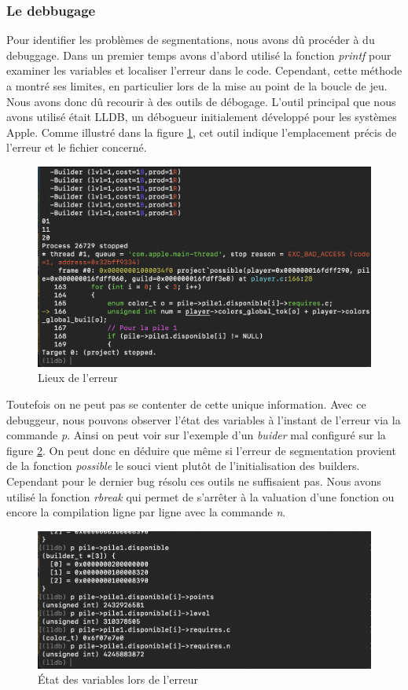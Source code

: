 \documentclass{article}
\begin{document}
\subsubsection{Le debbugage}

\vspace{1em}

 

\hspace{1em} Pour identifier les problèmes de segmentations, nous avons dû procéder à du debuggage. Dans un premier temps avons d'abord utilisé la fonction \emph{printf}  pour examiner les variables et localiser l'erreur dans le code. Cependant, cette méthode a montré ses limites, en particulier lors de la mise au point de la boucle de jeu. Nous avons donc dû recourir à des outils de débogage. L'outil principal que nous avons utilisé était LLDB, un débogueur initialement développé pour les systèmes Apple. Comme illustré dans la figure \ref{fig:lieux erreur}, cet outil indique l'emplacement précis de l'erreur et le fichier concerné.



\begin{figure}[ht]
    \centering
    \includegraphics[width=0.45\linewidth]{Lieux erreur.png}
    \caption{Lieux de l'erreur}
    \label{fig:lieux erreur}
\end{figure}
\newpage
Toutefois on ne peut pas se contenter de cette unique information. Avec ce debuggeur, nous pouvons observer l'état des variables à l'instant de l'erreur via la commande \emph{p}. Ainsi on peut voir sur l'exemple d'un \emph{buider} mal configuré sur la figure \ref{fig:print lldb}. On peut donc en déduire que même si l'erreur de segmentation provient de la fonction \emph{possible} le souci vient plutôt de l'initialisation des builders. Cependant pour le dernier bug résolu ces outils ne suffisaient pas. Nous avons utilisé la fonction \emph{rbreak} qui permet de s'arrêter à la valuation d'une fonction ou encore la compilation ligne par ligne avec la commande \emph{n}. 


\begin{figure}[ht]
    \centering
    \includegraphics[width = 0.5 \linewidth]{printlldb.png}
    \caption{État des variables lors de l'erreur}
    \label{fig:print lldb}
\end{figure}
\end{document}
